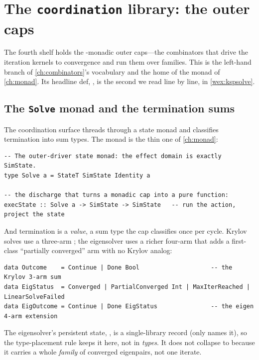 \section{The \texttt{coordination} library: the outer caps}
\label{sec:coordination}

The fourth shelf holds the -monadic outer caps---the combinators that
drive the iteration kernels to convergence and run them over families. This is the
left-hand branch of \cref{ch:combinators}'s vocabulary and the home of the monad of
\cref{ch:monad}. Its headline def, , is the second we read line by
line, in \cref{wex:kspsolve}.

\subsection{The \texttt{Solve} monad and the termination sums}

The coordination surface threads  through a state monad and
classifies termination into sum types. The monad is the thin one of \cref{ch:monad}:

\begin{lstlisting}[style=l4style]
-- The outer-driver state monad: the effect domain is exactly SimState.
type Solve a = StateT SimState Identity a

-- the discharge that turns a monadic cap into a pure function:
execState :: Solve a -> SimState -> SimState   -- run the action, project the state
\end{lstlisting}
And termination is a \emph{value}, a sum type the cap classifies once per cycle.
Krylov solves use a three-arm ; the eigensolver uses a richer four-arm
 that adds a first-class ``partially converged'' arm with no Krylov
analog:

\begin{lstlisting}[style=l4style]
data Outcome    = Continue | Done Bool                    -- the Krylov 3-arm sum
data EigStatus  = Converged | PartialConverged Int | MaxIterReached | LinearSolveFailed
data EigOutcome = Continue | Done EigStatus               -- the eigen 4-arm extension
\end{lstlisting}
The eigensolver's persistent state, , is a single-library record
(only  names it), so the type-placement rule keeps it here, not in
\emph{types}. It does not collapse to  because it carries a whole
\emph{family} of converged eigenpairs, not one iterate.

